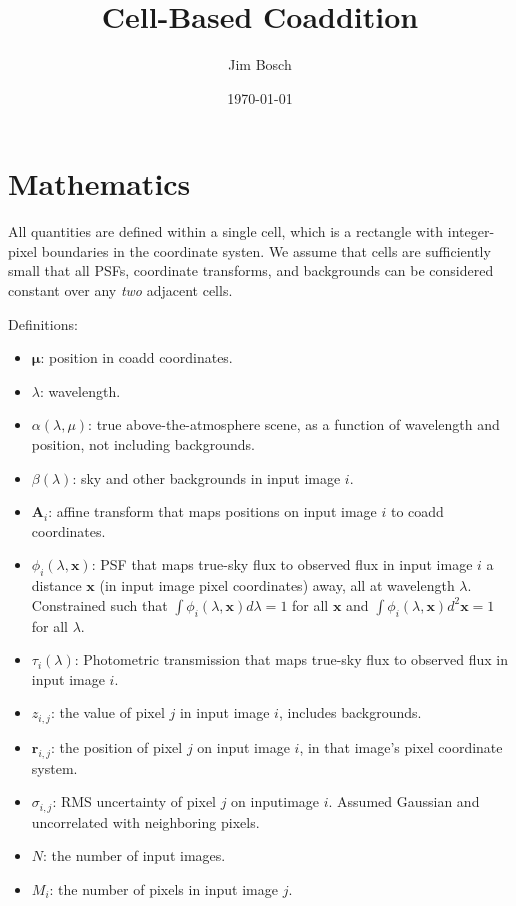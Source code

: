\documentclass[DM,authoryear,toc]{lsstdoc}
\title{Cell-Based Coaddition}
\author{%
Jim Bosch
}
\date{\today}
\begin{document}
\maketitle

\section{Mathematics}

All quantities are defined within a single cell, which is a rectangle with integer-pixel boundaries in the coordinate systen.
We assume that cells are sufficiently small that all PSFs, coordinate transforms, and backgrounds can be considered constant over any \emph{two} adjacent cells.

Definitions:

\begin{itemize}
\item $\bm{\mu}$: position in coadd coordinates.
\item $\lambda$: wavelength.
\item $\alpha(\lambda, \mu)$: true above-the-atmosphere scene, as a function of wavelength and position, not including backgrounds.
\item $\beta(\lambda)$: sky and other backgrounds in input image $i$.
\item $\bm{A}_i$: affine transform that maps positions on input image $i$ to coadd coordinates.
\item $\phi_i(\lambda, \bm{x})$: PSF that maps true-sky flux to observed flux in input image $i$ a distance $\bm{x}$ (in input image pixel coordinates) away, all at wavelength $\lambda$.
Constrained such that
$\int \phi_i(\lambda, \bm{x}) d\lambda = 1$ for all $\bm{x}$ and
$\int \phi_i(\lambda, \bm{x}) d^2\bm{x} = 1$ for all $\lambda$.
\item $\tau_i(\lambda)$: Photometric transmission that maps true-sky flux to observed flux in input image $i$.
\item $z_{i,j}$: the value of pixel $j$ in input image $i$, includes backgrounds.
\item $\bm{r}_{i,j}$: the position of pixel $j$ on input image $i$, in that image's pixel coordinate system.
\item $\sigma_{i,j}$: RMS uncertainty of pixel $j$ on inputimage $i$.  Assumed Gaussian and uncorrelated with neighboring pixels.
\item $N$: the number of input images.
\item $M_i$: the number of pixels in input image $j$.
\end{itemize}
\end{document}
